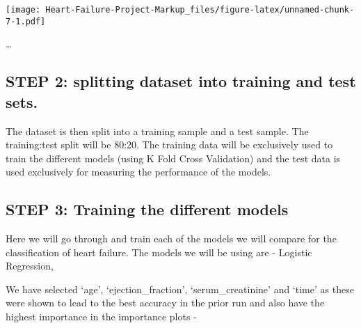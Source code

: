 \documentclass[
]{article}
\newenvironment{Shaded}{\begin{snugshade}}{\end{snugshade}}
\newcommand{\AttributeTok}[1]{\textcolor[rgb]{0.77,0.63,0.00}{#1}}
\newcommand{\ConstantTok}[1]{\textcolor[rgb]{0.00,0.00,0.00}{#1}}
\newcommand{\DecValTok}[1]{\textcolor[rgb]{0.00,0.00,0.81}{#1}}
\newcommand{\FloatTok}[1]{\textcolor[rgb]{0.00,0.00,0.81}{#1}}
\newcommand{\FunctionTok}[1]{\textcolor[rgb]{0.00,0.00,0.00}{#1}}
\newcommand{\NormalTok}[1]{#1}
\newcommand{\OtherTok}[1]{\textcolor[rgb]{0.56,0.35,0.01}{#1}}
\newcommand{\SpecialCharTok}[1]{\textcolor[rgb]{0.00,0.00,0.00}{#1}}
\begin{document}
\texttt{[image: Heart-Failure-Project-Markup\_files/figure-latex/unnamed-chunk-7-1.pdf]}

\ldots{}

\hypertarget{step-2-splitting-dataset-into-training-and-test-sets.}{%
\subsection{STEP 2: splitting dataset into training and test
sets.}\label{step-2-splitting-dataset-into-training-and-test-sets.}}

The dataset is then split into a training sample and a test sample. The
training:test split will be 80:20. The training data will be exclusively
used to train the different models (using K Fold Cross Validation) and
the test data is used exclusively for measuring the performance of the
models.

\begin{Shaded}
\end{Shaded}

\hypertarget{step-3-training-the-different-models}{%
\subsection{STEP 3: Training the different
models}\label{step-3-training-the-different-models}}

Here we will go through and train each of the models we will compare for
the classification of heart failure. The models we will be using are -
Logistic Regression,

We have selected `age', `ejection\_fraction', `serum\_creatinine' and
`time' as these were shown to lead to the best accuracy in the prior run
and also have the highest importance in the importance plots -
\end{document}
